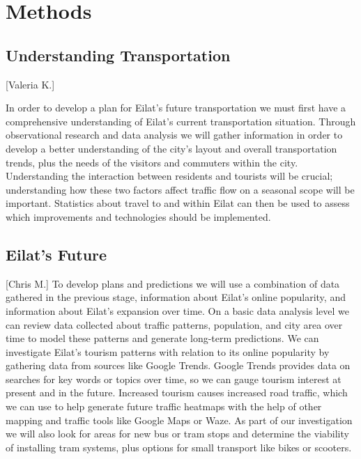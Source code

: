 \documentclass[12pt]{article}                         %
\begin{document}

\newpage
\section{Methods}

\subsection{Understanding Transportation}[Valeria K.]

In order to develop a plan for Eilat's future transportation we must first have a comprehensive understanding of Eilat's current transportation situation. Through observational research and data analysis we will gather information in order to develop a better understanding of the city's layout and overall transportation trends, plus the needs of the visitors and commuters within the city. Understanding the interaction between residents and tourists will be crucial; understanding how these two factors affect traffic flow on a seasonal scope will be important. Statistics about travel to and within Eilat can then be used to assess which improvements and technologies should be implemented.

\subsection{Eilat's Future}[Chris M.]
To develop plans and predictions we will use a combination of data gathered in the previous stage, information about Eilat's online popularity, and information about Eilat's expansion over time. On a basic data analysis level we can review data collected about traffic patterns, population, and city area over time to model these patterns and generate long-term predictions. We can investigate Eilat's tourism patterns with relation to its online popularity by gathering data from sources like Google Trends. Google Trends provides data on searches for key words or topics over time, so we can gauge tourism interest at present and in the future. Increased tourism causes increased road traffic, which we can use to help generate future traffic heatmaps with the help of other mapping and traffic tools like Google Maps or Waze. As part of our investigation we will also look for areas for new bus or tram stops and determine the viability of installing tram systems, plus options for small transport like bikes or scooters.
\end{document}
